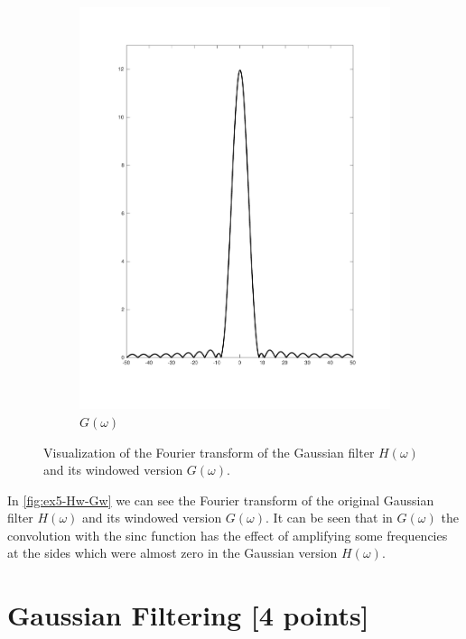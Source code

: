 \documentclass[tikz,14pt,fleqn]{article}
\newcommand{\FIXME}[1]{{\color{FIXMECOLOR}{\textbf{FIXME: #1}}}}
\begin{document}
\begin{figure}[H]
\begin{subfigure}{0.49\linewidth}
        \includegraphics[width=\linewidth]{fig/5.gw.pdf}
        \caption{$G(\omega)$}
        \label{fig:ex5-Gw}
    \end{subfigure}
    \caption{Visualization of the Fourier transform of the Gaussian filter $H(\omega)$ and its windowed version $G(\omega)$.}
    \label{fig:ex5-Hw-Gw}
\end{figure}

\FIXME{plots}

In \autoref{fig:ex5-Hw-Gw} we can see the Fourier transform of the original Gaussian filter $H(\omega)$ and its windowed version $G(\omega)$. It can be seen that in $G(\omega)$ the convolution with the sinc function has the effect of amplifying some frequencies at the sides which were almost zero in the Gaussian version $H(\omega)$.

\clearpage
\section{Gaussian Filtering [4 points]}
\end{document}
